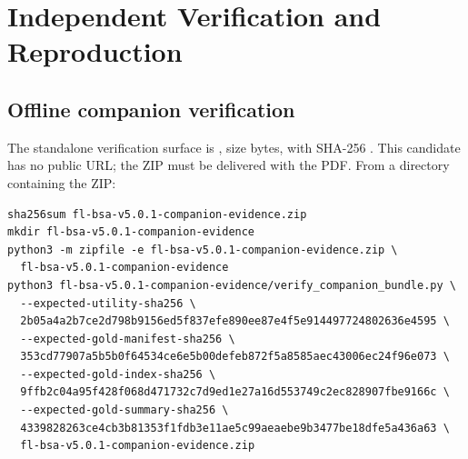 \section{Independent Verification and Reproduction}

\subsection{Offline companion verification}

The standalone verification surface is \IdentityText{\CompanionFilenameRaw}, size
\CompanionSizeRaw{} bytes, with SHA-256 \IdentityText{\CompanionShaRaw}. This candidate has no
public URL; the ZIP must be delivered with the PDF. From a directory containing the ZIP:

\begin{verbatim}
sha256sum fl-bsa-v5.0.1-companion-evidence.zip
mkdir fl-bsa-v5.0.1-companion-evidence
python3 -m zipfile -e fl-bsa-v5.0.1-companion-evidence.zip \
  fl-bsa-v5.0.1-companion-evidence
python3 fl-bsa-v5.0.1-companion-evidence/verify_companion_bundle.py \
  --expected-utility-sha256 \
  2b05a4a2b7ce2d798b9156ed5f837efe890ee87e4f5e914497724802636e4595 \
  --expected-gold-manifest-sha256 \
  353cd77907a5b5b0f64534ce6e5b00defeb872f5a8585aec43006ec24f96e073 \
  --expected-gold-index-sha256 \
  9ffb2c04a95f428f068d471732c7d9ed1e27a16d553749c2ec828907fbe9166c \
  --expected-gold-summary-sha256 \
  4339828263ce4cb3b81353f1fdb3e11ae5c99aeaebe9b3477be18dfe5a436a63 \
  fl-bsa-v5.0.1-companion-evidence.zip
\end{verbatim}

